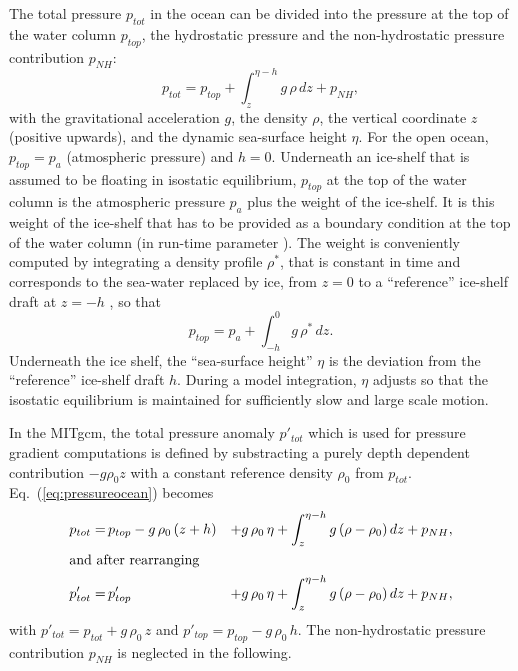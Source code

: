 The total pressure $p_{tot}$ in the ocean can be divided into the
pressure at the top of the water column $p_{top}$, the hydrostatic
pressure and the non-hydrostatic pressure contribution $p_{NH}$:
\begin{equation}
  \label{eq:pressureocean}
  p_{tot} = p_{top} + \int_z^{\eta-h} g\,\rho\,dz + p_{NH}, 
\end{equation}
with the gravitational acceleration $g$, the density $\rho$, the
vertical coordinate $z$ (positive upwards), and the dynamic
sea-surface height $\eta$. For the open ocean, $p_{top}=p_{a}$
(atmospheric pressure) and $h=0$. Underneath an ice-shelf that is
assumed to be floating in isostatic equilibrium, $p_{top}$ at the top
of the water column is the atmospheric pressure $p_{a}$ plus the
weight of the ice-shelf. It is this weight of the ice-shelf that has
to be provided as a boundary condition at the top of the water column
(in run-time parameter ).
The weight is conveniently computed by integrating a density profile
$\rho^*$, that is constant in time and corresponds to the sea-water
replaced by ice, from $z=0$ to a ``reference'' ice-shelf draft at
$z=-h$ \citep{beckmann99}, so that
\begin{equation}
  \label{eq:ptop}
  p_{top} = p_{a} + \int_{-h}^{0}g\,\rho^{*}\,dz.
\end{equation}
Underneath the ice shelf, the ``sea-surface height'' $\eta$ is the
deviation from the ``reference'' ice-shelf draft $h$. During a model
integration, $\eta$ adjusts so that the isostatic equilibrium is
maintained for sufficiently slow and large scale motion.
  
In the MITgcm, the total pressure anomaly $p'_{tot}$ which is used for
pressure gradient computations is defined by substracting a purely
depth dependent contribution $-g\rho_{0}z$ with a constant reference
density $\rho_{0}$ from $p_{tot}$.  Eq.~(\ref{eq:pressureocean}) becomes
\begin{alignat}{2}
  \label{eq:pressure}
  p_{tot} =& \,p_{top} - g\,\rho_0\,(z+h)  &+ g\,\rho_0\,\eta + \int_z^{\eta-h}
  g\,(\rho-\rho_0)\,dz +   p_{NH}, \\
  \intertext{and after rearranging}
  p'_{tot} =& \,p'_{top}
  &+ g\,\rho_0\,\eta + \int_z^{\eta-h}g\,(\rho-\rho_0)\,dz +   p_{NH}, 
\end{alignat}
with $p'_{tot} = p_{tot} + g\,\rho_0\,z$ and $p'_{top} = p_{top} -
g\,\rho_0\,h$. The non-hydrostatic pressure contribution $p_{NH}$ is
neglected in the following.

